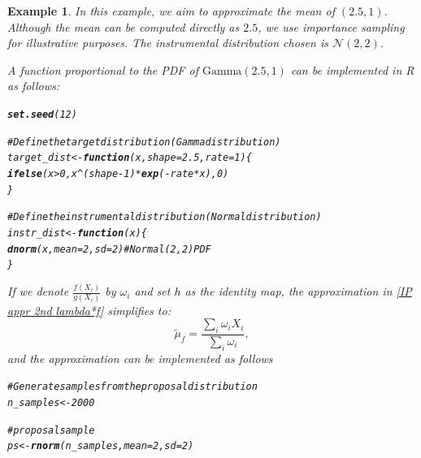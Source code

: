 \documentclass{article}\usepackage[]{graphicx}\usepackage[]{xcolor}
\makeatletter
\newcommand{\hlnum}[1]{\textcolor[rgb]{0.686,0.059,0.569}{#1}}%
\newcommand{\hlcom}[1]{\textcolor[rgb]{0.678,0.584,0.686}{\textit{#1}}}%
\newcommand{\hlopt}[1]{\textcolor[rgb]{0,0,0}{#1}}%
\newcommand{\hldef}[1]{\textcolor[rgb]{0.345,0.345,0.345}{#1}}%
\newcommand{\hlkwa}[1]{\textcolor[rgb]{0.161,0.373,0.58}{\textbf{#1}}}%
\newcommand{\hlkwb}[1]{\textcolor[rgb]{0.69,0.353,0.396}{#1}}%
\newcommand{\hlkwc}[1]{\textcolor[rgb]{0.333,0.667,0.333}{#1}}%
\newcommand{\hlkwd}[1]{\textcolor[rgb]{0.737,0.353,0.396}{\textbf{#1}}}%
\newenvironment{kframe}{%
 \def\at@end@of@kframe{}%
 \ifinner\ifhmode%
  \def\at@end@of@kframe{\end{minipage}}%
  \begin{minipage}{\columnwidth}%
 \fi\fi%
 \def\FrameCommand##1{\hskip\@totalleftmargin \hskip-\fboxsep
 \colorbox{shadecolor}{##1}\hskip-\fboxsep
     \hskip-\linewidth \hskip-\@totalleftmargin \hskip\columnwidth}%
 \MakeFramed {\advance\hsize-\width
   \@totalleftmargin\z@ \linewidth\hsize
   \@setminipage}}%
 {\par\unskip\endMakeFramed%
 \at@end@of@kframe}
\newenvironment{knitrout}{}{} %
\newtheorem{example}{Example}
\makeatother
\begin{document}
\begin{example}
In this example, we aim to approximate the mean of $(2.5,1)$. Although the mean can be computed directly as $2.5$, we use importance sampling for illustrative purposes. The instrumental distribution chosen is $\mathcal{N}(2,2)$.

A function proportional to the PDF of $\text{Gamma}(2.5,1)$ can be implemented in R as follows:

\begin{knitrout}
\color{fgcolor}\begin{kframe}
\begin{alltt}
\hlkwd{set.seed}\hldef{(}\hlnum{12}\hldef{)}

\hlcom{# Define the target distribution (Gamma distribution)}
\hldef{target_dist} \hlkwb{<-} \hlkwa{function}\hldef{(}\hlkwc{x}\hldef{,} \hlkwc{shape} \hldef{=} \hlnum{2.5}\hldef{,} \hlkwc{rate} \hldef{=} \hlnum{1}\hldef{) \{}
  \hlkwd{ifelse}\hldef{(x} \hlopt{>} \hlnum{0}\hldef{, x}\hlopt{^}\hldef{(shape} \hlopt{-} \hlnum{1}\hldef{)} \hlopt{*} \hlkwd{exp}\hldef{(}\hlopt{-}\hldef{rate} \hlopt{*} \hldef{x),} \hlnum{0}\hldef{)}
\hldef{\}}

\hlcom{# Define the instrumental distribution (Normal distribution)}
\hldef{instr_dist} \hlkwb{<-} \hlkwa{function}\hldef{(}\hlkwc{x}\hldef{) \{}
  \hlkwd{dnorm}\hldef{(x,} \hlkwc{mean} \hldef{=} \hlnum{2}\hldef{,} \hlkwc{sd} \hldef{=} \hlnum{2}\hldef{)}  \hlcom{# Normal(2, 2) PDF}
\hldef{\}}
\end{alltt}
\end{kframe}
\end{knitrout}

If we denote $\frac{f(X_i)}{g(X_i)}$ by $\omega_i$ and set $h$ as the identity map, the approximation in \eqref{IP appr 2nd lambda*f} simplifies to:
\begin{equation}
\tilde{\mu}_f = \frac{\sum_i \omega_i X_i}{\sum_i \omega_i},
\end{equation}
and the approximation can be implemented as follows 

\begin{knitrout}
\color{fgcolor}\begin{kframe}
\begin{alltt}
\hlcom{# Generate samples from the proposal distribution }
\hldef{n_samples} \hlkwb{<-} \hlnum{2000}

\hlcom{# proposal sample}
\hldef{ps} \hlkwb{<-} \hlkwd{rnorm}\hldef{(n_samples,} \hlkwc{mean} \hldef{=} \hlnum{2}\hldef{,} \hlkwc{sd} \hldef{=} \hlnum{2}\hldef{)}


\end{alltt}
\end{kframe}
\end{knitrout}
\end{example}
\end{document}
